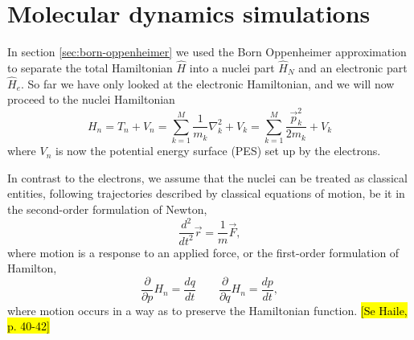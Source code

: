 \documentclass[11pt,bibliography=totoc,index=totoc]{scrbook}   %
\newcommand{\comment}[1]{\hl{#1}}
\begin{document}

%
\chapter{Molecular dynamics simulations}\label{cha:molecular-dynamics}
%

In section \ref{sec:born-oppenheimer} we used the Born Oppenheimer approximation to separate the total Hamiltonian $\hat{H}$ into a nuclei part $\hat{H}_N$ and an electronic part $\hat{H}_e$. 
So far we have only looked at the electronic Hamiltonian, and we will now proceed to the nuclei Hamiltonian
\begin{equation}
  H_n = T_n + V_n = \sum_{k=1}^M \frac{1}{m_k}\nabla_k^2 + V_k = \sum_{k=1}^M \frac{\vec{p}_k^2}{2m_k} + V_k
  \label{eq:nucleiHamiltonian}
\end{equation}
where $V_n$ is now the potential energy surface (PES) set up by the electrons.

In contrast to the electrons, we assume that the nuclei can be treated as classical entities, following trajectories described by 
classical equations of motion, be it in the
second-order formulation of Newton,
\begin{equation}
  \frac{d^2}{d t^2} \vec{r} = \frac{1}{m}\vec{F},
\end{equation}
where motion is a response to an applied force,
or the first-order formulation of Hamilton,
\begin{equation}
  \frac{\partial}{\partial p} H_n = \frac{dq}{dt} \qquad
  \frac{\partial}{\partial q} H_n = \frac{dp}{dt},
\end{equation}
where motion occurs in a way as to preserve the Hamiltonian function.
\comment{[Se Haile, p. 40-42]}
\end{document}
